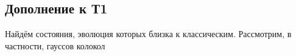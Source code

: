 
\subsection*{Дополнение к Т1}

Найдём состояния, эволюция которых близка к классическим. Рассмотрим, в частности, гауссов колокол 
